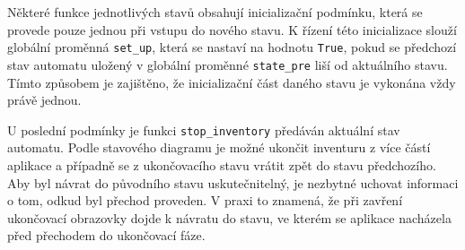 Některé funkce jednotlivých stavů obsahují inicializační podmínku, která se provede pouze jednou při vstupu do nového stavu. K řízení této inicializace slouží globální proměnná \texttt{set\_up}, která se nastaví na hodnotu \texttt{True}, pokud se předchozí stav automatu uložený v globální proměnné \texttt{state\_pre} liší od aktuálního stavu. Tímto způsobem je zajištěno, že inicializační část daného stavu je vykonána vždy právě jednou.





U poslední podmínky je funkci \texttt{stop\_inventory} předáván aktuální stav automatu. Podle stavového diagramu je možné ukončit inventuru z více částí aplikace a případně se z ukončovacího stavu vrátit zpět do stavu předchozího. Aby byl návrat do původního stavu uskutečnitelný, je nezbytné uchovat informaci o tom, odkud byl přechod proveden. V praxi to znamená, že při zavření ukončovací obrazovky dojde k návratu do stavu, ve kterém se aplikace nacházela před přechodem do ukončovací fáze.


